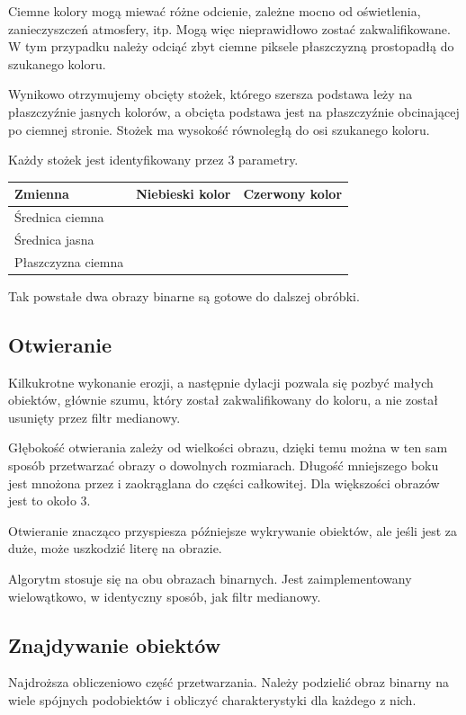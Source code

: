 \documentclass[a4paper,12pt]{article}
\begin{document}
			Ciemne kolory mogą miewać różne odcienie, zależne mocno od oświetlenia, zanieczyszczeń atmosfery, itp. Mogą więc nieprawidłowo zostać zakwalifikowane.
			W tym przypadku należy odciąć zbyt ciemne piksele płaszczyzną prostopadłą do szukanego koloru.
			
			Wynikowo otrzymujemy obcięty stożek, którego szersza podstawa leży na płaszczyźnie jasnych kolorów, a obcięta podstawa jest na płaszczyźnie obcinającej po ciemnej stronie. Stożek ma wysokość równoległą do osi szukanego koloru.
			
			Każdy stożek jest identyfikowany przez 3 parametry.
			
			\begin{center}
				\begin{tabular}{ l | c  c }
					Zmienna & Niebieski kolor & Czerwony kolor \\
					\hline
					Średnica ciemna 		& \darkblueradius{} 	& \darkredradius{} \\
					Średnica jasna			& \lightblueradius{}	& \lightredradius{} \\
					Płaszczyzna ciemna		& \darkbluethreshold{}	& \darkredthreshold{} \\
				\end{tabular}
			\end{center}
			
			Tak powstałe dwa obrazy binarne są gotowe do dalszej obróbki.
			
		\subsection{Otwieranie}
			Kilkukrotne wykonanie erozji, a następnie dylacji pozwala się pozbyć małych obiektów, głównie szumu, który został zakwalifikowany do koloru, a nie został usunięty przez filtr medianowy.
			
			Głębokość otwierania zależy od wielkości obrazu, dzięki temu można w ten sam sposób przetwarzać obrazy o dowolnych rozmiarach.
			Długość mniejszego boku jest mnożona przez \openingdepth{} i zaokrąglana do części całkowitej.
			Dla większości obrazów jest to około 3.
			
			Otwieranie znacząco przyspiesza późniejsze wykrywanie obiektów, ale jeśli jest za duże, może uszkodzić literę na obrazie.
			
			Algorytm stosuje się na obu obrazach binarnych.
			Jest zaimplementowany wielowątkowo, w identyczny sposób, jak filtr medianowy.
			
		\subsection{Znajdywanie obiektów}
			Najdroższa obliczeniowo część przetwarzania.
			Należy podzielić obraz binarny na wiele spójnych podobiektów i obliczyć charakterystyki dla każdego z nich.
			
\end{document}
